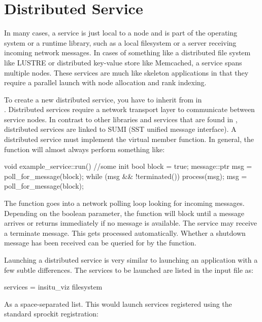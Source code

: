 \section{Distributed Service}
\label{sec:distService}
In many cases, a service is just local to a node and is part of the operating system or a runtime library, such as a local filesystem or a server receiving incoming network messages.  In cases of something like a distributed file system like LUSTRE or distributed key-value store like Memcached, a service spans multiple nodes.  These services are much like skeleton applications in that they require a parallel launch with node allocation and rank indexing.

To create a new distributed service, you have to inherit from  in \\
.  
Distributed services require a network transport layer to communicate between service nodes.
In contrast to other libraries and services that are found in , distributed services are linked to SUMI (SST unified message interface).
A distributed service must implement the  virtual member function.
In general, the  function will almost always perform something like:

\begin{CppCode}
void example_service::run()
{
 //some init
 bool block  = true;
 message::ptr msg = poll_for_message(block);
 while (msg && !terminated()){
   process(msg);
   msg = poll_for_message(block);
 }
}
\end{CppCode}
The function  goes into a network polling loop looking for incoming messages.
Depending on the boolean parameter, the function will block until a message arrives or returns immediately if no message is available.
The service may receive a terminate message.
This gets processed automatically.
Whether a shutdown message has been received can be queried for by the  function.

Launching a distributed service is very similar to launching an application with a few subtle differences.
The services to be launched are listed in the input file as:

\begin{ViFile}
services = insitu_viz filesystem
\end{ViFile}
As a space-separated list.
This would launch services registered using the standard sprockit registration:

